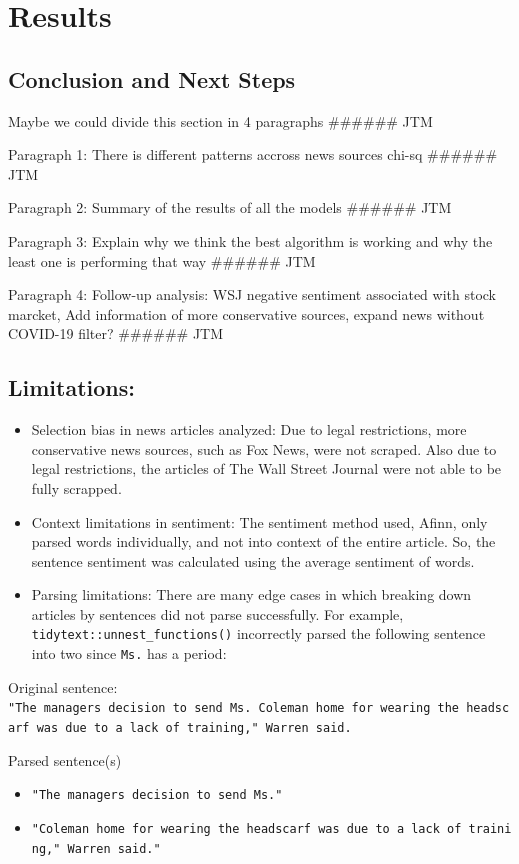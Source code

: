 \documentclass[
]{article}
\begin{document}
\hypertarget{results}{%
\section{Results}\label{results}}

\hypertarget{conclusion-and-next-steps}{%
\subsection{Conclusion and Next Steps}\label{conclusion-and-next-steps}}

Maybe we could divide this section in 4 paragraphs \#\#\#\#\#\# JTM

Paragraph 1: There is different patterns accross news sources chi-sq
\#\#\#\#\#\# JTM

Paragraph 2: Summary of the results of all the models \#\#\#\#\#\# JTM

Paragraph 3: Explain why we think the best algorithm is working and why
the least one is performing that way \#\#\#\#\#\# JTM

Paragraph 4: Follow-up analysis: WSJ negative sentiment associated with
stock marcket, Add information of more conservative sources, expand news
without COVID-19 filter? \#\#\#\#\#\# JTM

\hypertarget{limitations}{%
\subsection{Limitations:}\label{limitations}}

\begin{itemize}
\item
  Selection bias in news articles analyzed: Due to legal restrictions,
  more conservative news sources, such as Fox News, were not scraped.
  Also due to legal restrictions, the articles of The Wall Street
  Journal were not able to be fully scrapped.
\item
  Context limitations in sentiment: The sentiment method used, Afinn,
  only parsed words individually, and not into context of the entire
  article. So, the sentence sentiment was calculated using the average
  sentiment of words.
\item
  Parsing limitations: There are many edge cases in which breaking down
  articles by sentences did not parse successfully. For example,
  \texttt{tidytext::unnest\_functions()} incorrectly parsed the
  following sentence into two since \texttt{Ms.} has a period:
\end{itemize}

Original sentence:
\texttt{"The\ manager\textquotesingle{}s\ decision\ to\ send\ Ms.\ Coleman\ home\ for\ wearing\ the\ headscarf\ was\ due\ to\ a\ lack\ of\ training,"\ Warren\ said.}

Parsed sentence(s)

\begin{itemize}
\item
  \texttt{"The\ manager\textquotesingle{}s\ decision\ to\ send\ Ms."}
\item
  \texttt{"Coleman\ home\ for\ wearing\ the\ headscarf\ was\ due\ to\ a\ lack\ of\ training,"\ Warren\ said."}
\end{itemize}
\end{document}
